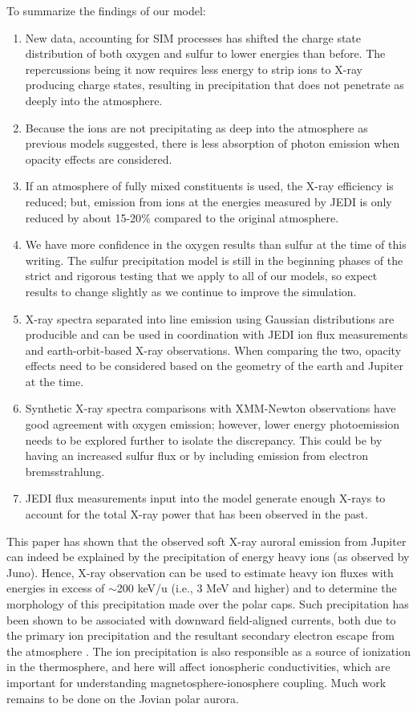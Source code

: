 \documentclass[draft]{agujournal2018}
\begin{document}
To summarize the findings of our model:
\begin{enumerate}
    \item New data, accounting for SIM processes has shifted the charge state distribution of both oxygen and sulfur to lower energies than before.
    The repercussions being it now requires less energy to strip ions to X-ray producing charge states, resulting in precipitation that does not penetrate as deeply into the atmosphere.
    \item Because the ions are not precipitating as deep into the atmosphere as previous models suggested, there is less absorption of photon emission when opacity effects are considered.
    \item If an atmosphere of fully mixed constituents is used, the X-ray efficiency is reduced; but, emission from ions at the energies measured by JEDI is only reduced by about 15-20$\%$ compared to the original atmosphere.
    \item We have more confidence in the oxygen results than sulfur at the time of this writing.
    The sulfur precipitation model is still in the beginning phases of the strict and rigorous testing that we apply to all of our models, so expect results to change slightly as we continue to improve the simulation.
    \item X-ray spectra separated into line emission using Gaussian distributions are producible and can be used in coordination with JEDI ion flux measurements and earth-orbit-based X-ray observations.
    When comparing the two, opacity effects need to be considered based on the geometry of the earth and Jupiter at the time.
    \item Synthetic X-ray spectra comparisons with XMM-Newton observations have good agreement with oxygen emission; however, lower energy photoemission needs to be explored further to isolate the discrepancy.
    This could be by having an increased sulfur flux or by including emission from electron bremsstrahlung.
    \item JEDI flux measurements input into the model generate enough X-rays to account for the total X-ray power that has been observed in the past.
\end{enumerate}

This paper has shown that the observed soft X-ray auroral emission from Jupiter can indeed be explained by the precipitation of energy heavy ions (as observed by Juno).
Hence, X-ray observation can be used to estimate heavy ion fluxes with energies in excess of $\sim$200 keV/u (i.e., 3 MeV and higher) and to determine the morphology of this precipitation made over the polar caps.
Such precipitation has been shown to be associated with downward field-aligned currents, both due to the primary ion precipitation and the resultant secondary electron escape from the atmosphere \citep{cravens2003,houston2018,ozak2010,ozak2013}.
The ion precipitation is also responsible as a source of ionization in the thermosphere, and here will affect ionospheric conductivities, which are important for understanding magnetosphere-ionosphere coupling.
Much work remains to be done on the Jovian polar aurora.
\end{document}
